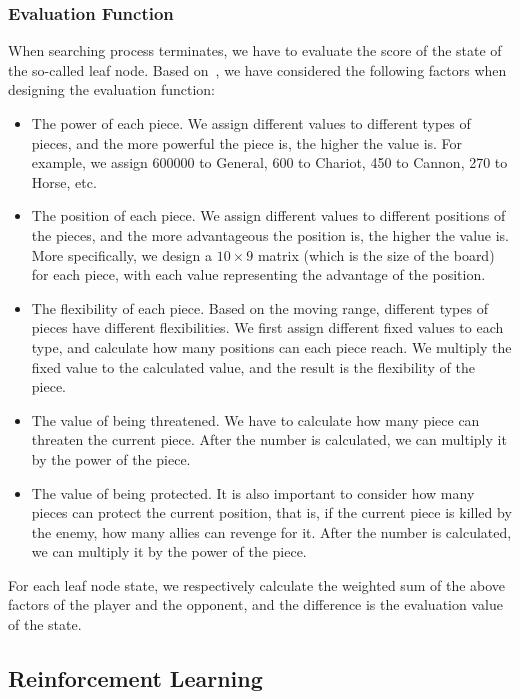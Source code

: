 \documentclass[letterpaper]{article}
\begin{document}
\subsubsection*{Evaluation Function} When searching process terminates, we have to evaluate the score of the state of the so-called leaf node.
Based on~\cite{yen2004computer}, we have considered the following factors when designing the evaluation function:
\begin{itemize}
    \item The power of each piece.
    We assign different values to different types of pieces, and the more powerful the piece is, the higher the value is.
    For example, we assign 600000 to General, 600 to Chariot, 450 to Cannon, 270 to Horse, etc.
    \item The position of each piece.
    We assign different values to different positions of the pieces, and the more advantageous the position is, the higher the value is.
    More specifically, we design a $10\times 9$ matrix (which is the size of the board) for each piece, with each value
    representing the advantage of the position.
    \item The flexibility of each piece.
    Based on the moving range, different types of pieces have different flexibilities.
    We first assign different fixed values to each type, and calculate how many positions can each piece reach.
    We multiply the fixed value to the calculated value, and the result is the flexibility of the piece.
    \item The value of being threatened.
    We have to calculate how many piece can threaten the current piece.
    After the number is calculated, we can multiply it by the power of the piece.
    \item The value of being protected.
    It is also important to consider how many pieces can protect the current position, that is, if the current piece is killed by the enemy, how many allies can revenge for it.
    After the number is calculated, we can multiply it by the power of the piece.
\end{itemize}
For each leaf node state, we respectively calculate the weighted sum of the above factors of the player and the opponent, and the difference is the evaluation value of the state.

\subsection{Reinforcement Learning}\label{subsec:reinforcement-learning}

\end{document}
